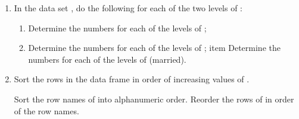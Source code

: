 \begin{enumerate}
\item In the data set , do
the following for each of the two levels of :
\begin{enumerate}
  \item Determine the numbers for each of the levels of ;
  \item Determine the numbers for each of the levels of ;
  item Determine the numbers for each of the levels of  (married).
\end{enumerate}

\item Sort the rows in the data frame  in order
of increasing values of .

\begin{Schunk}
\end{Schunk}

Sort the row names of  into
alphanumeric order.  Reorder the rows of  in order
of the row names.


\end{enumerate}
